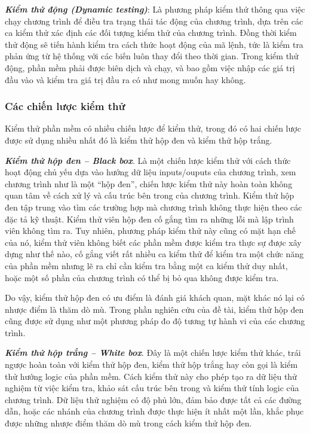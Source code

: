 \textbf{\textit{Kiểm thử động (Dynamic testing)}}: Là phương pháp kiểm thử thông qua việc chạy chương trình để điều tra trạng thái tác động của chương trình, dựa trên các ca kiểm thử xác định các đối tượng kiểm thử của chương trình. Đồng thời kiểm thử động sẽ tiến hành kiểm tra cách thức hoạt động của mã lệnh, tức là kiểm tra phản ứng từ hệ thống với các biến luôn thay đổi theo thời gian. Trong kiểm thử động, phần mềm phải được biên dịch và chạy, và bao gồm việc nhập các giá trị đầu vào và kiểm tra giá trị đầu ra có như mong muốn hay không.	
	
\subsubsection{Các chiến lược kiểm thử}
Kiểm thử phần mềm có nhiều chiến lược để kiểm thử, trong đó có hai chiến lược được sử dụng nhiều nhất đó là kiểm thử hộp đen và kiểm thử hộp trắng.
	
\textbf{\textit{Kiểm thử hộp đen – Black box}}. Là một chiến lược kiểm thử với cách thức hoạt động chủ yếu dựa vào hướng dữ liệu inputs/ouputs của chương trình, xem chương trình như là một “hộp đen”, chiến lược kiểm thử này  hoàn toàn không quan tâm về cách xử lý và cấu trúc bên trong của chương trình. Kiểm thử hộp đen tập trung vào tìm các trường hợp mà chương trình không thực hiện theo các đặc tả kỹ thuật. Kiểm thử viên hộp đen cố gắng tìm ra những lỗi mà lập trình viên không tìm ra. Tuy nhiên, phương pháp kiểm thử này cũng có mặt hạn chế của nó, kiểm thử viên không biết các phần mềm được kiểm tra thực sự được xây dựng như thế nào, cố gắng viết rất nhiều ca kiểm thử để kiểm tra một chức năng của phần mềm nhưng lẽ ra chỉ cần kiểm tra bằng một ca kiểm thử duy nhất, hoặc một số phần của chương trình có thể bị bỏ qua không được kiểm tra.
		
Do vậy, kiểm thử hộp đen có ưu điểm là đánh giá khách quan, mặt khác nó lại có nhược điểm là thăm dò mù. Trong phần nghiên cứu của đề tài, kiểm thử hộp đen cũng được sử dụng như một phương pháp đo độ tương tự hành vi của các chương trình.
		
\textbf{\textit{Kiểm thử hộp trắng – White box}}. Đây là một chiến lược kiểm thử khác, trái ngược hoàn toàn với kiểm thử hộp đen, kiểm thử hộp trắng hay còn gọi là kiểm thử hướng logic của phần mềm. Cách kiểm thử này cho phép tạo ra dữ liệu thử nghiệm từ việc kiểm tra, khảo sát cấu trúc bên trong và kiểm thử tính logic của chương trình. Dữ liệu thử nghiệm có độ phủ lớn, đảm bảo được tất cả các đường dẫn, hoặc các nhánh của chương trình được thực hiện ít nhất một lần, khắc phục được những nhược điểm thăm dò mù trong cách kiểm thử hộp đen.
		
